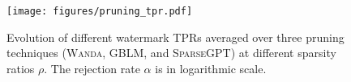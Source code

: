 \begin{figure}[t]
    \centering
    \texttt{[image: figures/pruning\_tpr.pdf]}
    \caption{Evolution of different watermark TPRs averaged over three pruning techniques (\textsc{Wanda}, \textsc{GBLM}, and \textsc{SparseGPT}) at different sparsity ratios $\rho$. The rejection rate $\alpha$ is in logarithmic scale.}
    \label{fig:pruning_tpr}
    \vspace{-0.2em}
\end{figure}
